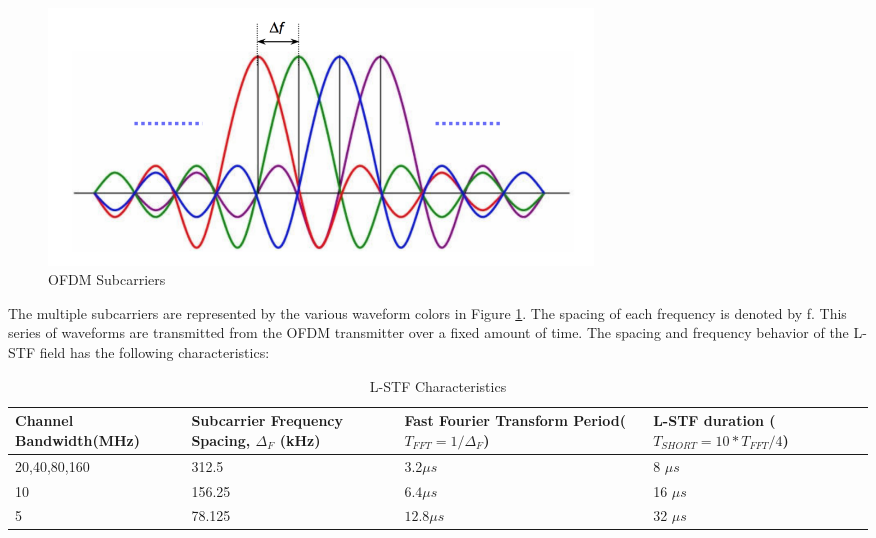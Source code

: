 \begin{figure}[ht!]
	\centering
	\includegraphics[width=0.70\textwidth]{img/ofdm-subcarriers}
	\caption{OFDM Subcarriers}
	\label{fig:ofdm_subcarriers}
\end{figure}\par
The multiple subcarriers are represented by the various waveform colors in Figure \ref{fig:ofdm_subcarriers}.  The spacing of each frequency is denoted by f.  This series of waveforms are transmitted from the OFDM transmitter over a fixed amount of time. The spacing and frequency behavior of the L-STF field has the following characteristics: \par
\begin{table}[ht!]
	\centering
\begin{tabular}{|p{3.6cm}|p{4cm}|p{4cm}|p{4.5cm}|}
	\hline
	Channel Bandwidth\newline(MHz) & Subcarrier Frequency Spacing, $\Delta_F$ (kHz) &Fast Fourier Transform Period\newline($T_{FFT}=1/\Delta_F$)& L-STF duration \newline($T_{SHORT}=10*T_{FFT}/4$) \\
	\hline
	20,40,80,160 & 312.5 &3.2$\mu s$ &8 $\mu s$ \\
	10 & 156.25 &$6.4\mu s$ &16 $\mu s $\\
	5 & 78.125 &$12.8\mu s$ &32 $\mu s$  \\
	\hline
\end{tabular} 
	\caption{L-STF Characteristics}
	\label{table:spacing}
\end{table} \par 
	
